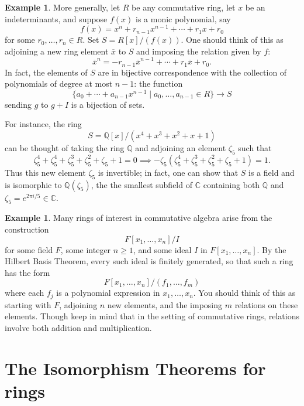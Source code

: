 \documentclass[12pt]{report}
\numberwithin{equation}{section}
\numberwithin{theorem}{chapter}
\theoremstyle{definition}
\newtheorem{example}[theorem]{Example}
\newtheorem*{basic properties}{Basic Properties}
\newtheorem*{Important Remark}{Important Remark}
\newcommand{\C}{\mathbb{C}}
\begin{document}
\begin{example}\label{example quotient with zeta5}
More generally, let $R$ be any commutative ring, let $x$ be an indeterminants, and suppose $f(x)$ is a monic polynomial, say
$$f(x) = x^n + r_{n-1} x^{n-1} + \cdots  + r_1 x + r_0$$ 
for some $r_0, \dots, r_n \in R$. Set $S = R[x]/(f(x))$. One should think of this as adjoining a new ring element $\overline{x}$ to $S$ and imposing the relation given by $f$:
$$\overline{x}^n = - r_{n-1} \overline{x}^{n-1} + \cdots  + r_1 \overline{x} + r_0.$$
In fact, the elements of $S$ are in bijective correspondence with the collection of polynomials of degree at most $n-1$: the function 
$$\{a_0 + \cdots + a_{n-1}x^{n-1} \mid a_0, \dots, a_{n-1} \in R\} \longrightarrow S$$ 
sending $g$ to $g + I$ is a bijection of sets. 

For instance, the ring 
$$S = \mathbb{Q}[x]/(x^4+x^3+x^2+x+1)$$
can be thought of taking the ring $\mathbb{Q}$ and adjoining an element $\zeta_5$ such that
$$\zeta_5^4 + \zeta_5^4 + \zeta_5^3 + \zeta_5^2 + \zeta_5 + 1 = 0 \implies -\zeta_5(\zeta_5^4 + \zeta_5^3 + \zeta_5^2 + \zeta_5 + 1) = 1.$$
Thus this new element $\zeta_5$ is invertible; in fact, one can show that $S$ is a field and is isomorphic to $\mathbb{Q}(\zeta_5)$, the the smallest subfield of $\C$ containing both $\mathbb{Q}$ and $\zeta_5 = e^{2\pi i/5} \in \C$. 
 \end{example}



  
\begin{example} 
Many rings of interest in commutative algebra arise from the construction 
$$F[x_1, \dots, x_n]/I$$
for some field $F$, some integer $n \geqslant 1$, and some ideal $I$ in $F[x_1, \ldots, x_n]$. By the Hilbert Basis Theorem, every such ideal is finitely generated, so that such a ring has the form
$$F[x_1, \dots, x_n]/(f_1, \dots, f_m)$$
where each $f_j$ is a polynomial expression in $x_1, \dots, x_n$. You should think of this as starting with $F$, adjoining $n$ new elements, and the imposing $m$ relations on these elements. Though keep in mind that in the setting of commutative rings, relations involve both addition and multiplication.
 \end{example}




\section{The Isomorphism Theorems for rings}
\end{document}
